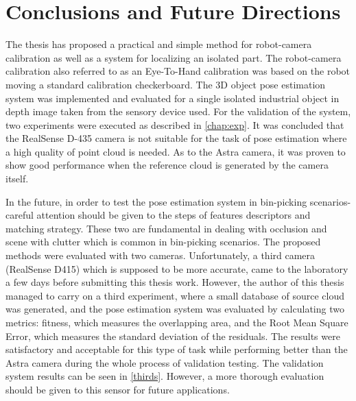 \chapter{Conclusions and Future Directions}
\label{chap:con}

The thesis has proposed a practical and simple method for robot-camera calibration as well as a system for localizing an isolated part. The robot-camera calibration also referred to as an Eye-To-Hand calibration was based on the robot moving a standard calibration checkerboard. The 3D object pose estimation system was implemented and evaluated for a single isolated industrial object in depth image taken from the sensory device used. For the validation of the system, two experiments were executed as described in \ref{chap:exp}. It was concluded that the RealSense D-435 camera is not suitable for the task of pose estimation where a high quality of point cloud is needed. As to the Astra camera, it was proven to show good performance when the reference cloud is generated by the camera itself.

In the future, in order to test the pose estimation system in bin-picking scenarios-careful attention should be given to the steps of features descriptors and matching strategy. These two are fundamental in dealing with occlusion and scene with clutter which is common in bin-picking scenarios. The proposed methods were evaluated with two cameras. Unfortunately, a third camera (RealSense D415) which is supposed to be more accurate, came to the laboratory a few days before submitting this thesis work. However, the author of this thesis managed to carry on a third experiment, where a small database of source cloud was generated, and the pose estimation system was evaluated by calculating two metrics: fitness, which measures the overlapping area, and the Root Mean Square Error, which measures the standard deviation of the residuals.
 The results were satisfactory and acceptable for this type of task while performing better than the Astra camera during the whole process of validation testing. The validation system results can be seen in \ref{thirds}. However, a more thorough evaluation should be given to this sensor for future applications.  




